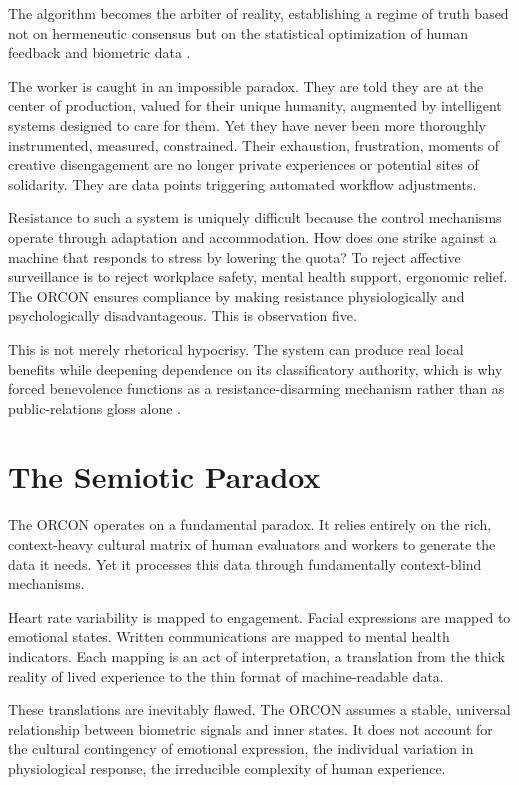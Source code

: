 \documentclass[runningheads]{llncs}
\begin{document}
The algorithm becomes the arbiter of reality, establishing a regime of truth based not on hermeneutic consensus but on the statistical optimization of human feedback and biometric data \cite{kellogg2020algorithms}.

The worker is caught in an impossible paradox. They are told they are at the center of production, valued for their unique humanity, augmented by intelligent systems designed to care for them. Yet they have never been more thoroughly instrumented, measured, constrained. Their exhaustion, frustration, moments of creative disengagement are no longer private experiences or potential sites of solidarity. They are data points triggering automated workflow adjustments.

Resistance to such a system is uniquely difficult because the control mechanisms operate through adaptation and accommodation. How does one strike against a machine that responds to stress by lowering the quota? To reject affective surveillance is to reject workplace safety, mental health support, ergonomic relief. The ORCON ensures compliance by making resistance physiologically and psychologically disadvantageous. This is observation five.

This is not merely rhetorical hypocrisy. The system can produce real local benefits while deepening dependence on its classificatory authority, which is why forced benevolence functions as a resistance-disarming mechanism rather than as public-relations gloss alone \cite{breque2021industry,delagarza2019time}.

\section{The Semiotic Paradox}

The ORCON operates on a fundamental paradox. It relies entirely on the rich, context-heavy cultural matrix of human evaluators and workers to generate the data it needs. Yet it processes this data through fundamentally context-blind mechanisms.

Heart rate variability is mapped to engagement. Facial expressions are mapped to emotional states. Written communications are mapped to mental health indicators. Each mapping is an act of interpretation, a translation from the thick reality of lived experience to the thin format of machine-readable data.

These translations are inevitably flawed. The ORCON assumes a stable, universal relationship between biometric signals and inner states. It does not account for the cultural contingency of emotional expression, the individual variation in physiological response, the irreducible complexity of human experience.
\end{document}
